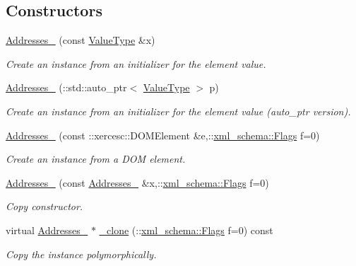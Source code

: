 \subsection*{Constructors}
\begin{DoxyCompactItemize}
\item 
\hyperlink{classopenstack_1_1xml_1_1Addresses___a8a33ca78cca4aee693b79d358c6a9ab9}{Addresses\_\-} (const \hyperlink{classopenstack_1_1xml_1_1Addresses}{ValueType} \&x)
\begin{DoxyCompactList}\small\item\em Create an instance from an initializer for the element value. \item\end{DoxyCompactList}\item 
\hyperlink{classopenstack_1_1xml_1_1Addresses___a89ca839731cc6b255e5873e55e82481d}{Addresses\_\-} (::std::auto\_\-ptr$<$ \hyperlink{classopenstack_1_1xml_1_1Addresses}{ValueType} $>$ p)
\begin{DoxyCompactList}\small\item\em Create an instance from an initializer for the element value (auto\_\-ptr version). \item\end{DoxyCompactList}\item 
\hyperlink{classopenstack_1_1xml_1_1Addresses___a0868ce24bbcb70f783a8d9e2b4d882b0}{Addresses\_\-} (const ::xercesc::DOMElement \&e,::\hyperlink{namespacexml__schema_affb4c227cbd9aa7453dd1dc5a1401943}{xml\_\-schema::Flags} f=0)
\begin{DoxyCompactList}\small\item\em Create an instance from a DOM element. \item\end{DoxyCompactList}\item 
\hyperlink{classopenstack_1_1xml_1_1Addresses___a3dd7c9d87c17d443ea6d0f2a65d3aeb3}{Addresses\_\-} (const \hyperlink{classopenstack_1_1xml_1_1Addresses__}{Addresses\_\-} \&x,::\hyperlink{namespacexml__schema_affb4c227cbd9aa7453dd1dc5a1401943}{xml\_\-schema::Flags} f=0)
\begin{DoxyCompactList}\small\item\em Copy constructor. \item\end{DoxyCompactList}\item 
virtual \hyperlink{classopenstack_1_1xml_1_1Addresses__}{Addresses\_\-} $\ast$ \hyperlink{classopenstack_1_1xml_1_1Addresses___a3423aace734fc3ff82929736b244be3c}{\_\-clone} (::\hyperlink{namespacexml__schema_affb4c227cbd9aa7453dd1dc5a1401943}{xml\_\-schema::Flags} f=0) const 
\begin{DoxyCompactList}\small\item\em Copy the instance polymorphically. \item\end{DoxyCompactList}\end{DoxyCompactItemize}
